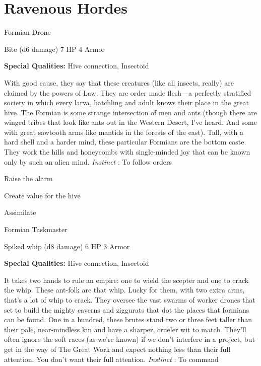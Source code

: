 \chapter{Ravenous Hordes}
   
 


\startMonsterName
Formian Drone	 
\stopMonsterName
 

Bite (d6 damage)	7 HP	4 Armor

 


 
\startMonsterQualities
{\bf Special Qualities:}  Hive connection, Insectoid
\stopMonsterQualities
 
\startMonsterDescription
With good cause, they say that these creatures (like all insects, really) are claimed by the powers of Law. They are order made flesh—a perfectly stratified society in which every larva, hatchling and adult knows their place in the great hive. The Formian is some strange intersection of men and ants (though there are winged tribes that look like ants out in the Western Desert, I’ve heard. And some with great sawtooth arms like mantids in the forests of the east). Tall, with a hard shell and a harder mind, these particular Formians are the bottom caste. They work the hills and honeycombs with single-minded joy that can be known only by such an alien mind. {\em Instinct} : To follow orders
\stopMonsterDescription
 
\startitemize[1,packed]

\item Raise the alarm

 
\item Create value for the hive

 
\item Assimilate


\stopitemize
 
\startMonsterName
Formian Taskmaster	 
\stopMonsterName
 

Spiked whip (d8 damage)	6 HP	3 Armor

 


 
\startMonsterQualities
{\bf Special Qualities:}  Hive connection, Insectoid
\stopMonsterQualities
 
\startMonsterDescription
It takes two hands to rule an empire: one to wield the scepter and one to crack the whip. These ant-folk are that whip. Lucky for them, with two extra arms, that’s a lot of whip to crack. They oversee the vast swarms of worker drones that set to build the mighty caverns and ziggurats that dot the places that formians can be found. One in a hundred, these brutes stand two or three feet taller than their pale, near-mindless kin and have a sharper, crueler wit to match. They’ll often ignore the soft races (as we’re known) if we don’t interfere in a project, but get in the way of The Great Work and expect nothing less than their full attention. You don’t want their full attention. {\em Instinct} : To command
\stopMonsterDescription
 
